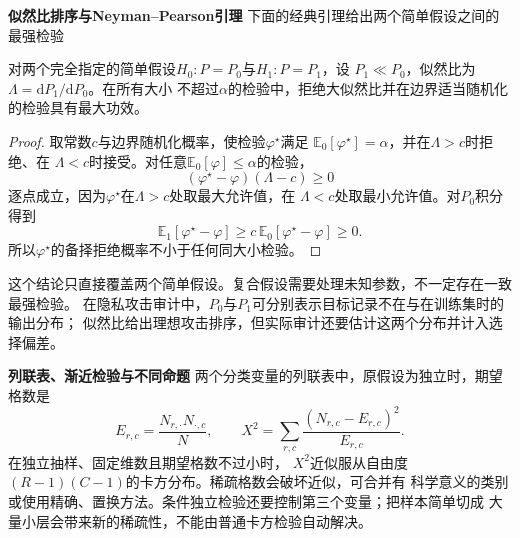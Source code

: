 \par\medskip\noindent\textbf{似然比排序与Neyman–Pearson引理}\quad
下面的经典引理给出两个简单假设之间的最强检验
\begin{theorem}
\label{thm:statistics-neyman-pearson}
对两个完全指定的简单假设\(H_0:P=P_0\)与\(H_1:P=P_1\)，设
\(P_1\ll P_0\)，似然比为\(\Lambda=\mathrm dP_1/\mathrm dP_0\)。在所有大小
不超过\(\alpha\)的检验中，拒绝大似然比并在边界适当随机化的检验具有最大功效。
\end{theorem}

\begin{proof}
取常数\(c\)与边界随机化概率，使检验\(\varphi^\star\)满足
\(\mathbb{E}_0[\varphi^\star]=\alpha\)，并在\(\Lambda>c\)时拒绝、在
\(\Lambda<c\)时接受。对任意\(\mathbb{E}_0[\varphi]\leq\alpha\)的检验，
\[
  (\varphi^\star-\varphi)(\Lambda-c)\geq0
\]
逐点成立，因为\(\varphi^\star\)在\(\Lambda>c\)处取最大允许值，在
\(\Lambda<c\)处取最小允许值。对\(P_0\)积分得到
\[
  \mathbb{E}_1[\varphi^\star-\varphi]
  \geq c\,\mathbb{E}_0[\varphi^\star-\varphi]\geq0.
\]
所以\(\varphi^\star\)的备择拒绝概率不小于任何同大小检验。
\end{proof}

这个结论只直接覆盖两个简单假设。复合假设需要处理未知参数，不一定存在一致最强检验。
在隐私攻击审计中，\(P_0\)与\(P_1\)可分别表示目标记录不在与在训练集时的输出分布；
似然比给出理想攻击排序，但实际审计还要估计这两个分布并计入选择偏差。

\par\medskip\noindent\textbf{列联表、渐近检验与不同命题}\quad
两个分类变量的列联表中，原假设为独立时，期望格数是
\[
  E_{r,c}=\frac{N_{r,\cdot}N_{\cdot,c}}{N},\qquad
  X^2=\sum_{r,c}\frac{(N_{r,c}-E_{r,c})^2}{E_{r,c}}.
\]
在独立抽样、固定维数且期望格数不过小时，
\(X^2\)近似服从自由度\((R-1)(C-1)\)的卡方分布。稀疏格数会破坏近似，可合并有
科学意义的类别或使用精确、置换方法。条件独立检验还要控制第三个变量；把样本简单切成
大量小层会带来新的稀疏性，不能由普通卡方检验自动解决。


